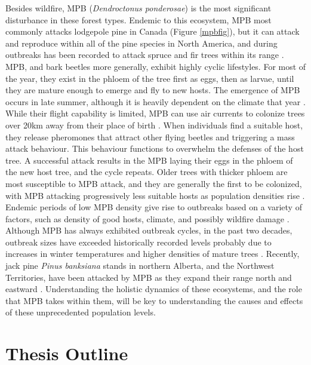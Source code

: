 Besides wildfire, MPB (\textit{Dendroctonus ponderosae}) is the most significant disturbance in these forest types. Endemic to this ecosystem, MPB most commonly attacks lodgepole pine in Canada \cite{safranyik2007mountain} (Figure \ref{mpbfig}), but it can attack and reproduce within all of the pine species in North America, and during outbreaks has been recorded to attack spruce and fir trees within its range \cite{gibson2009mountain}. MPB, and bark beetles more generally, exhibit highly cyclic lifestyles. For most of the year, they exist in the phloem of the tree first as eggs, then as larvae, until they are mature enough to emerge and fly to new hosts. The emergence of MPB occurs in late summer, although it is heavily dependent on the climate that year \cite{bentz2014mountain}. While their flight capability is limited, MPB can use air currents to colonize trees over 20km away from their place of birth \cite{shegelski2019morphological}. When individuals find a suitable host, they release pheromones that attract other flying beetles and triggering a mass attack behaviour. This behaviour functions to overwhelm the defenses of the host tree. A successful attack results in the MPB laying their eggs in the phloem of the new host tree, and the cycle repeats. Older trees with thicker phloem are most susceptible to MPB attack, and they are generally the first to be colonized, with MPB attacking progressively less suitable hosts as population densities rise \cite{safranyik2007mountain}. Endemic periods of low MPB density give rise to outbreaks based on a variety of factors, such as density of good hosts, climate, and possibly wildfire damage \cite{safranyik2007mountain}. Although MPB has always exhibited outbreak cycles, in the past two decades, outbreak sizes have exceeded historically recorded levels probably due to increases in winter temperatures and higher densities of mature trees \cite{bentz2010climate,safranyik2007mountain}. Recently, jack pine \textit{Pinus banksiana} stands in northern Alberta, and the Northwest Territories, have been attacked by MPB as they expand their range north and eastward \cite{cudmore2010climate,nrcanmpb}. Understanding the holistic dynamics of these ecosystems, and the role that MPB takes within them, will be key to understanding the causes and effects of these unprecedented population levels. 

\section{Thesis Outline}

